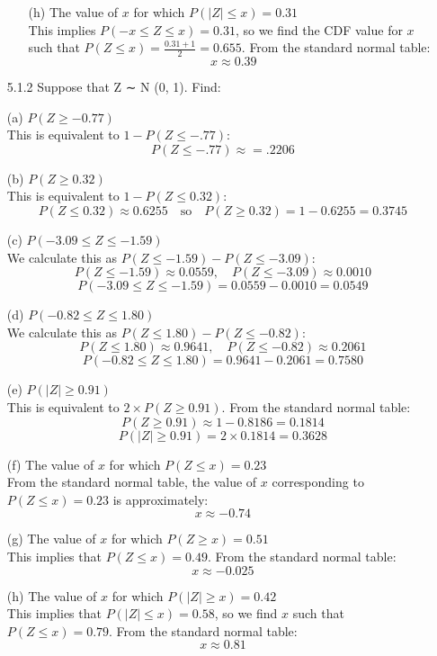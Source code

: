 \documentclass{article}
\begin{document}
\begin{itemize}
\begin{itemize}
    \item[(h)] The value of \( x \) for which \( P(|Z| \leq x) = 0.31 \) \\
    This implies \( P(-x \leq Z \leq x) = 0.31 \), so we find the CDF value for \( x \) such that \( P(Z \leq x) = \frac{0.31 + 1}{2} = 0.655 \). From the standard normal table:
    \[
    x \approx 0.39
    \]
\end{itemize}


5.1.2 Suppose that Z ∼ N (0, 1). Find: 
    \item[(a)] \( P(Z \geq -0.77) \) \\
    This is equivalent to \( 1 - P(Z \leq -.77) \):
    \[    P(Z \leq -.77) \approx = .2206    \]

    \item[(b)] \( P(Z \geq 0.32) \) \\
    This is equivalent to \( 1 - P(Z \leq 0.32) \):
    \[    P(Z \leq 0.32) \approx 0.6255 \quad \text{so} \quad P(Z \geq 0.32) = 1 - 0.6255 = 0.3745    \]

    \item[(c)] \( P(-3.09 \leq Z \leq -1.59) \) \\
    We calculate this as \( P(Z \leq -1.59) - P(Z \leq -3.09) \):
    \[    P(Z \leq -1.59) \approx 0.0559, \quad P(Z \leq -3.09) \approx 0.0010    \]
    \[    P(-3.09 \leq Z \leq -1.59) = 0.0559 - 0.0010 = 0.0549    \]

    \item[(d)] \( P(-0.82 \leq Z \leq 1.80) \) \\
    We calculate this as \( P(Z \leq 1.80) - P(Z \leq -0.82) \):
    \[    P(Z \leq 1.80) \approx 0.9641, \quad P(Z \leq -0.82) \approx 0.2061    \]
    \[    P(-0.82 \leq Z \leq 1.80) = 0.9641 - 0.2061 = 0.7580    \]

    \item[(e)] \( P(|Z| \geq 0.91) \) \\
    This is equivalent to \( 2 \times P(Z \geq 0.91) \). From the standard normal table:
    \[    P(Z \geq 0.91) \approx 1 - 0.8186 = 0.1814    \]
    \[    P(|Z| \geq 0.91) = 2 \times 0.1814 = 0.3628    \]

    \item[(f)] The value of \( x \) for which \( P(Z \leq x) = 0.23 \) \\
    From the standard normal table, the value of \( x \) corresponding to \( P(Z \leq x) = 0.23 \) is approximately:
    \[    x \approx -0.74    \]

    \item[(g)] The value of \( x \) for which \( P(Z \geq x) = 0.51 \) \\
    This implies that \( P(Z \leq x) = 0.49 \). From the standard normal table:
    \[    x \approx -0.025    \]

    \item[(h)] The value of \( x \) for which \( P(|Z| \geq x) = 0.42 \) \\
    This implies that \( P(|Z| \leq x) = 0.58 \), so we find \( x \) such that \( P(Z \leq x) = 0.79 \). From the standard normal table:
    \[    x \approx 0.81    \]
\end{itemize}
\end{document}
